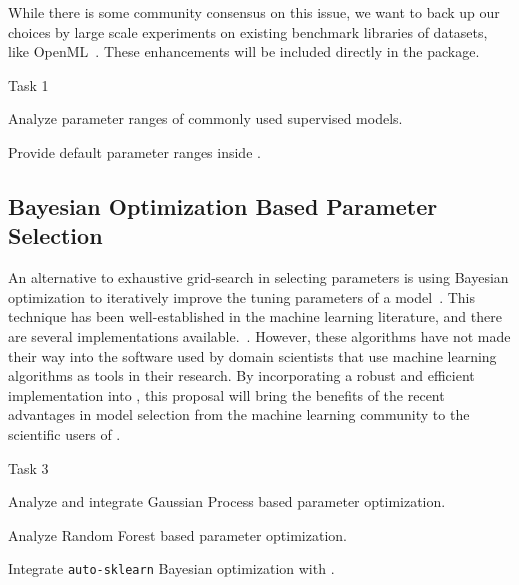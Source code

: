 While there is some community consensus on this issue, we want to back
up our choices by large scale experiments on existing benchmark libraries
of datasets, like OpenML~\autocite{van2013openml}. These enhancements will
be included directly in the \sklearn{} package.
\begin{labeling}{Task 1}
    \itemsep-4pt
    \item [Task 1] Analyze parameter ranges of commonly used supervised models.
    \item [Task 2] Provide default parameter ranges inside \sklearn{}.
\end{labeling}

\subsection{Bayesian Optimization Based Parameter Selection}
An alternative to exhaustive grid-search in selecting parameters is using
Bayesian optimization to iteratively improve the tuning parameters of a
model~\autocite{NIPS2011_4443, shahriari2016taking, NIPS2012_4522}. This
technique has been well-established in the machine learning literature, and
there are several implementations available.~\autocite{bergstra2013hyperopt,
feurer-nips2015, komer2014hyperopt, snoek2015scalable}.  However, these
algorithms have not made their way into the software used by domain scientists
that use machine learning algorithms as tools in their research.
By incorporating a robust and efficient implementation into \sklearn{},
this proposal will bring the benefits of the recent advantages in model selection
from the machine learning community to the scientific users of \sklearn{}.
\begin{labeling}{Task 3}
    \itemsep-4pt
    \item [Task 3] Analyze and integrate Gaussian Process based parameter optimization.
    \item [Task 4] Analyze Random Forest based parameter optimization.
    \item [Task 5] Integrate \texttt{auto-sklearn} Bayesian optimization with \sklearn{}.
\end{labeling}

